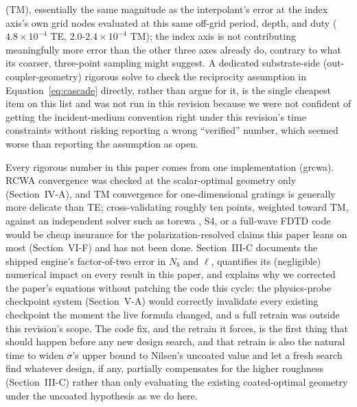 \documentclass[10pt,twocolumn]{article}
\begin{document}
(TM), essentially the same magnitude as the interpolant's error at the
index axis's own grid nodes evaluated at this same off-grid period, depth,
and duty ($4.8\times10^{-4}$ TE, $2.0$-$2.4\times10^{-4}$ TM); the index
axis is not contributing meaningfully more error than the other three
axes already do, contrary to what its coarser, three-point sampling might
suggest. A dedicated substrate-side
(out-coupler-geometry) rigorous solve to check the reciprocity assumption
in Equation~\eqref{eq:cascade} directly, rather than argue for it, is the
single cheapest item on this list and was not run in this revision because
we were not confident of getting the incident-medium convention right
under this revision's time constraints without risking reporting a wrong
``verified'' number, which seemed worse than reporting the assumption as
open.

Every rigorous number in this paper comes from one implementation
(grcwa). RCWA convergence was checked at the scalar-optimal geometry only
(Section~IV-A), and TM convergence for one-dimensional gratings is
generally more delicate than TE; cross-validating roughly ten points,
weighted toward TM, against an independent solver such as torcwa
\cite{kim2023torcwa}, S4, or a full-wave FDTD code would be cheap insurance
for the polarization-resolved claims this paper leans on most
(Section~VI-F) and has not been done. Section~III-C documents the shipped
engine's factor-of-two error in $N_b$ and $\ell$, quantifies its
(negligible) numerical impact on every result in this paper, and explains
why we corrected the paper's equations without patching the code this
cycle: the physics-probe checkpoint system (Section~V-A) would correctly
invalidate every existing checkpoint the moment the live formula changed,
and a full retrain was outside this revision's scope. The code fix, and
the retrain it forces, is the first thing that should happen before any
new design search, and that retrain is also the natural time to widen
$\sigma$'s upper bound to Nilsen's uncoated value and let a fresh search
find whatever design, if any, partially compensates for the higher
roughness (Section~III-C) rather than only evaluating the existing
coated-optimal geometry under the uncoated hypothesis as we do here.
\end{document}
